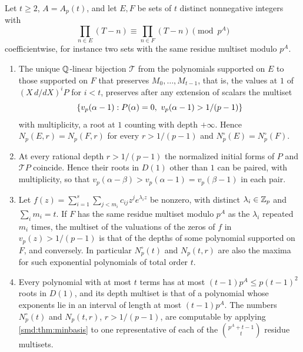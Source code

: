 \begin{theorem}\label{smd:thm:transport}
Let $t\ge2$, $A=A_p(t)$, and let $E,F$ be sets of $t$ distinct nonnegative integers with
\[
 \prod_{n\in E}(T-n)\equiv\prod_{n\in F}(T-n)\pmod{p^A}
\]
coefficientwise, for instance two sets with the same residue multiset modulo $p^A$.
\begin{enumerate}[label=\textup{(\alph*)}]
\item The unique $\mathbb{Q}$-linear bijection $\mathcal T$ from the polynomials supported on $E$ to
those supported on $F$ that preserves $M_0,\dots,M_{t-1}$, that is, the values at $1$ of
$(X\,d/dX)^iP$ for $i<t$, preserves after any extension of scalars the multiset
\[
 \set{v_p(\alpha-1) : P(\alpha)=0,\ v_p(\alpha-1)>1/(p-1)}
\]
with multiplicity, a root at $1$ counting with depth $+\infty$. Hence $N_p(E,r)=N_p(F,r)$ for
every $r>1/(p-1)$ and $N^\circ_p(E)=N^\circ_p(F)$.
\item At every rational depth $r>1/(p-1)$ the normalized initial forms of $P$ and
$\mathcal TP$ coincide. Hence their roots in $D(1)$ other than $1$ can be paired, with
multiplicity, so that $v_p(\alpha-\beta)>v_p(\alpha-1)=v_p(\beta-1)$ in each pair.
\item Let $f(z)=\sum_{i=1}^s\sum_{j<m_i}c_{ij}z^je^{\lambda_iz}$ be nonzero, with distinct
$\lambda_i\in\mathbb{Z}_p$ and $\sum_im_i=t$. If $F$ has the same residue multiset modulo $p^A$ as the
$\lambda_i$ repeated $m_i$ times, the multiset of the valuations of the zeros of $f$ in
$v_p(z)>1/(p-1)$ is that of the depths of some polynomial supported on $F$, and conversely. In
particular $N^\circ_p(t)$ and $N_p(t,r)$ are also the maxima for such exponential polynomials
of total order $t$.
\item Every polynomial with at most $t$ terms has at most $(t-1)p^A\le p(t-1)^2$ roots in
$D(1)$, and its depth multiset is that of a polynomial whose exponents lie in an interval of
length at most $(t-1)p^A$. The numbers $N^\circ_p(t)$ and $N_p(t,r)$, $r>1/(p-1)$, are
computable by applying \cref{smd:thm:minbasis} to one representative of each of the
$\binom{p^A+t-1}t$ residue multisets.
\end{enumerate}
\end{theorem}

